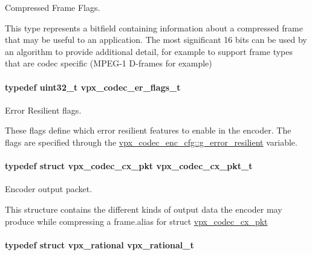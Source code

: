 Compressed Frame Flags. 

This type represents a bitfield containing information about a compressed frame that may be useful to an application. The most significant 16 bits can be used by an algorithm to provide additional detail, for example to support frame types that are codec specific (M\-P\-E\-G-\/1 D-\/frames for example) \hypertarget{group__encoder_ga77e0e1fff62556a4f4d54c84467a41f3}{
\paragraph[{vpx\-\_\-codec\-\_\-er\-\_\-flags\-\_\-t}]{\setlength{\rightskip}{0pt plus 5cm}typedef uint32\-\_\-t {\bf vpx\-\_\-codec\-\_\-er\-\_\-flags\-\_\-t}}}\label{group__encoder_ga77e0e1fff62556a4f4d54c84467a41f3}


Error Resilient flags. 

These flags define which error resilient features to enable in the encoder. The flags are specified through the \hyperlink{structvpx__codec__enc__cfg_a4e17173b66ca0d7dfba9978625d7ba76}{vpx\-\_\-codec\-\_\-enc\-\_\-cfg\-::g\-\_\-error\-\_\-resilient} variable. \hypertarget{group__encoder_ga3f711e17fbefac545e8959ef5a023556}{
\paragraph[{vpx\-\_\-codec\-\_\-cx\-\_\-pkt\-\_\-t}]{\setlength{\rightskip}{0pt plus 5cm}typedef struct {\bf vpx\-\_\-codec\-\_\-cx\-\_\-pkt}  {\bf vpx\-\_\-codec\-\_\-cx\-\_\-pkt\-\_\-t}}}\label{group__encoder_ga3f711e17fbefac545e8959ef5a023556}


Encoder output packet. 

This structure contains the different kinds of output data the encoder may produce while compressing a frame.\-alias for struct \hyperlink{structvpx__codec__cx__pkt}{vpx\-\_\-codec\-\_\-cx\-\_\-pkt} \hypertarget{group__encoder_ga2c08c6d71202024f17a5aef71a3d13e5}{
\paragraph[{vpx\-\_\-rational\-\_\-t}]{\setlength{\rightskip}{0pt plus 5cm}typedef struct {\bf vpx\-\_\-rational}  {\bf vpx\-\_\-rational\-\_\-t}}}\label{group__encoder_ga2c08c6d71202024f17a5aef71a3d13e5}


